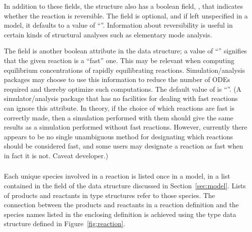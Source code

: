 \documentclass[10pt]{cekarticle}
\newcommand{\vref}[1]{\ref{#1}}
\newcommand{\changed}[1]{\textcolor{BrickRed}{#1}}
\begin{document}
In addition to these fields, the  structure also has a
boolean field, , that indicates whether the reaction is
reversible.  The field is optional, and if left unspecified in a model, it
defaults to a value of ``''.  Information about
reversibility is useful in certain kinds of structural analyses such as
elementary mode analysis.

The field  is another boolean attribute in the
 data structure; a value of ``''
signifies that the given reaction is a ``fast'' one.  This may be relevant
when computing equilibrium concentrations of rapidly equilibrating
reactions.  Simulation/analysis packages may \changed{choose} to use this
information to reduce the number of ODEs required and thereby optimize such
computations.  The default value of  is
``''.  (A simulator/analysis package that has no
facilities for dealing with fast reactions can ignore this attribute.  In
theory, if the choice of which reactions are fast is correctly made, then a
simulation performed with them should give the same results as a simulation
performed without fast reactions.  However, currently there appears to be
no single unambiguous method for designating which reactions should be
considered fast, and some users may designate a reaction as fast when in
fact it is not.  Caveat developer.)


\subsubsection{\changed{}}
\label{subsec:speciesreference}

Each unique \changed{species} involved in a reaction is listed once in a
model, in a list contained in the \changed{} field of the
 data structure discussed in Section~\ref{sec:model}.  Lists
of products and reactants in  type structures refer to
those species.  The connection between the products and reactants in a
reaction definition and the \changed{species} names listed in the enclosing
 definition is achieved using the
\changed{} type data structure defined in
Figure~\vref{fig:reaction}.
\end{document}
